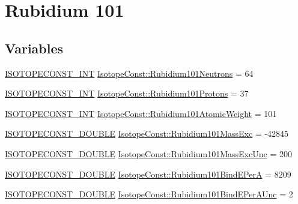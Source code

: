 \hypertarget{group___isotope_const-_rubidium-_rb101}{}\section{Rubidium 101}
\label{group___isotope_const-_rubidium-_rb101}
\subsection*{Variables}
\begin{DoxyCompactItemize}
\item 
\mbox{\hyperlink{group___isotope_const-_macros_ga5f18360b3e99483a35c32d789e62621c}{I\+S\+O\+T\+O\+P\+E\+C\+O\+N\+S\+T\+\_\+\+I\+NT}} \mbox{\hyperlink{group___isotope_const-_rubidium-_rb101_ga0eaf1534a5663c4476fc9fb31bb8168d}{Isotope\+Const\+::\+Rubidium101\+Neutrons}} = 64
\item 
\mbox{\hyperlink{group___isotope_const-_macros_ga5f18360b3e99483a35c32d789e62621c}{I\+S\+O\+T\+O\+P\+E\+C\+O\+N\+S\+T\+\_\+\+I\+NT}} \mbox{\hyperlink{group___isotope_const-_rubidium-_rb101_gaeabe86ba44c1b6ce3cb4cd6eb48e0afe}{Isotope\+Const\+::\+Rubidium101\+Protons}} = 37
\item 
\mbox{\hyperlink{group___isotope_const-_macros_ga5f18360b3e99483a35c32d789e62621c}{I\+S\+O\+T\+O\+P\+E\+C\+O\+N\+S\+T\+\_\+\+I\+NT}} \mbox{\hyperlink{group___isotope_const-_rubidium-_rb101_gaf16afbadc82e4158e900f5630a1cf464}{Isotope\+Const\+::\+Rubidium101\+Atomic\+Weight}} = 101
\item 
\mbox{\hyperlink{group___isotope_const-_macros_ga8f45a7272ce02c0b4c65c44636ed719a}{I\+S\+O\+T\+O\+P\+E\+C\+O\+N\+S\+T\+\_\+\+D\+O\+U\+B\+LE}} \mbox{\hyperlink{group___isotope_const-_rubidium-_rb101_ga7cc7ce7f7e750ff2be4babedd300e062}{Isotope\+Const\+::\+Rubidium101\+Mass\+Exc}} = -\/42845
\item 
\mbox{\hyperlink{group___isotope_const-_macros_ga8f45a7272ce02c0b4c65c44636ed719a}{I\+S\+O\+T\+O\+P\+E\+C\+O\+N\+S\+T\+\_\+\+D\+O\+U\+B\+LE}} \mbox{\hyperlink{group___isotope_const-_rubidium-_rb101_gaee22178044b08c8c4f067128515b8ceb}{Isotope\+Const\+::\+Rubidium101\+Mass\+Exc\+Unc}} = 200
\item 
\mbox{\hyperlink{group___isotope_const-_macros_ga8f45a7272ce02c0b4c65c44636ed719a}{I\+S\+O\+T\+O\+P\+E\+C\+O\+N\+S\+T\+\_\+\+D\+O\+U\+B\+LE}} \mbox{\hyperlink{group___isotope_const-_rubidium-_rb101_gaf998d4baa06e9d1f5020d1249c64ab99}{Isotope\+Const\+::\+Rubidium101\+Bind\+E\+PerA}} = 8209
\item 
\mbox{\hyperlink{group___isotope_const-_macros_ga8f45a7272ce02c0b4c65c44636ed719a}{I\+S\+O\+T\+O\+P\+E\+C\+O\+N\+S\+T\+\_\+\+D\+O\+U\+B\+LE}} \mbox{\hyperlink{group___isotope_const-_rubidium-_rb101_gae6c41d49f7aade25b790ae61071f25c2}{Isotope\+Const\+::\+Rubidium101\+Bind\+E\+Per\+A\+Unc}} = 2

\end{DoxyCompactItemize}
